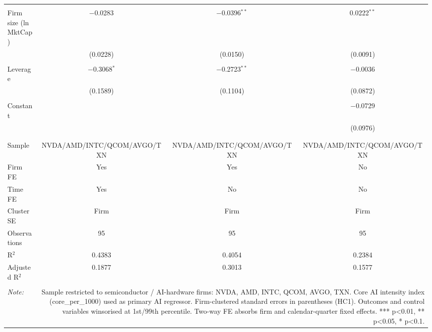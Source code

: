 \begin{table}[!htbp]
\begin{tabular}{@{\extracolsep{5pt}}lccc}
  & & & \\ 
 Firm size (ln MktCap) & $-$0.0283 & $-$0.0396$^{**}$ & 0.0222$^{**}$ \\ 
  & (0.0228) & (0.0150) & (0.0091) \\ 
  & & & \\ 
 Leverage & $-$0.3068$^{*}$ & $-$0.2723$^{**}$ & $-$0.0036 \\ 
  & (0.1589) & (0.1104) & (0.0872) \\ 
  & & & \\ 
 Constant &  &  & $-$0.0729 \\ 
  &  &  & (0.0976) \\ 
  & & & \\ 
\hline \\[-1.8ex] 
Sample & NVDA/AMD/INTC/QCOM/AVGO/TXN & NVDA/AMD/INTC/QCOM/AVGO/TXN & NVDA/AMD/INTC/QCOM/AVGO/TXN \\ 
Firm FE & Yes & Yes & No \\ 
Time FE & Yes & No & No \\ 
Cluster SE & Firm & Firm & Firm \\ 
Observations & 95 & 95 & 95 \\ 
R$^{2}$ & 0.4383 & 0.4054 & 0.2384 \\ 
Adjusted R$^{2}$ & 0.1877 & 0.3013 & 0.1577 \\ 
\hline 
\hline \\[-1.8ex] 
\textit{Note:}  & \multicolumn{3}{r}{Sample restricted to semiconductor / AI-hardware firms: NVDA, AMD, INTC, QCOM, AVGO, TXN. Core AI intensity index (core_per_1000) used as primary AI regressor. Firm-clustered standard errors in parentheses (HC1). Outcomes and control variables winsorised at 1st/99th percentile. Two-way FE absorbs firm and calendar-quarter fixed effects. *** p<0.01, ** p<0.05, * p<0.1.} \\ 
\end{tabular} 
\end{table} 
